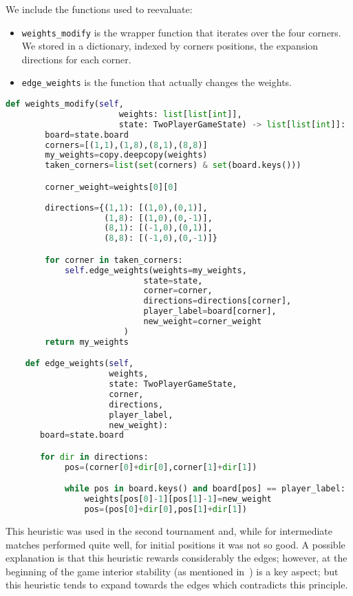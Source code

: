 \documentclass{article}
\begin{document}
We include the functions used to reevaluate: 
\begin{itemize}
    \item \texttt{weights\_modify} is the wrapper function that iterates over the four corners. We stored in a dictionary, indexed by corners positions, the expansion directions for each corner. 
    \item \texttt{edge\_weights} is the function that actually changes the weights.
\end{itemize}

\begin{lstlisting}[language=python, caption = Functions to reevaluate,captionpos=t]
    def weights_modify(self, 
                       weights: list[list[int]], 
                       state: TwoPlayerGameState) -> list[list[int]]:
        board=state.board
        corners=[(1,1),(1,8),(8,1),(8,8)]
        my_weights=copy.deepcopy(weights)
        taken_corners=list(set(corners) & set(board.keys()))

        corner_weight=weights[0][0]
    
        directions={(1,1): [(1,0),(0,1)],
                    (1,8): [(1,0),(0,-1)],
                    (8,1): [(-1,0),(0,1)],
                    (8,8): [(-1,0),(0,-1)]}

        for corner in taken_corners:
            self.edge_weights(weights=my_weights, 
                            state=state, 
                            corner=corner,
                            directions=directions[corner],
                            player_label=board[corner],
                            new_weight=corner_weight
                        )
        return my_weights

    def edge_weights(self,
                     weights,
                     state: TwoPlayerGameState,
                     corner, 
                     directions,
                     player_label,
                     new_weight):
       board=state.board

       for dir in directions:
            pos=(corner[0]+dir[0],corner[1]+dir[1])

            while pos in board.keys() and board[pos] == player_label:
                weights[pos[0]-1][pos[1]-1]=new_weight
                pos=(pos[0]+dir[0],pos[1]+dir[1])

\end{lstlisting}


This heuristic was used in the second tournament and, while for intermediate matches performed quite well, for initial positions it was not so good. A possible explanation is that this heuristic rewards considerably the edges; however, at the beginning of the game interior stability (as mentioned in~\textcite{othellus}) is a key aspect; but this heuristic tends to expand towards the edges which contradicts this principle.
\end{document}
